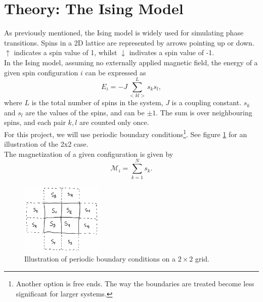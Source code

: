 \documentclass[notitlepage, reprint, nofootinbib]{revtex4-1}
\begin{document}
\section{Theory: The Ising Model}
As previously mentioned, the Ising model is widely used for simulating phase transitions. Spins in a 2D lattice are represented by arrows pointing up or down. $\uparrow$ indicates a spin value of 1, whilst $\downarrow$ indivates a spin value of -1. \\[2mm]
In the Ising model, assuming no externally applied magnetic field, the energy of a given spin configuration $i$ can be expressed as 
\begin{equation}\label{Ising_energy}E_i=-J\sum_{<kl>}^Ls_ks_l,\end{equation}
where $L$ is the total number of spins in the system, $J$ is a coupling constant. $s_k$ and $s_l$ are the values of the spins, and can be $\pm1$. The sum is over neighbouring spins, and each pair $k,l$ are counted only once. \\[2mm]
For this project, we will use periodic boundary conditions\footnote{Another option is free ends. The way the boundaries are treated become less significant for larger systems.}. See figure \ref{sketch} for an illustration of the 2x2 case.\\[2mm]
The magnetization of a given configuration is given by
\begin{equation}\label{magnetization}\mathcal{M}_i=\sum_{k=1}^N s_k.\end{equation}

\begin{figure} 
	\centering
	\includegraphics[width=0.35\textwidth]{../Figures/pbc_sketch.png}
	\caption{Illustration of periodic boundary conditions on a $2\times2$ grid.}
	\label{sketch}
\end{figure}
\end{document}
